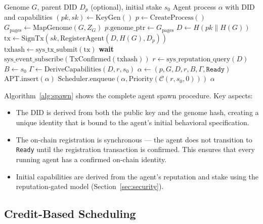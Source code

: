 \documentclass{article}
\begin{document}
\begin{algorithm}[t]
\caption{Agent Process Spawn}
\label{alg:spawn}
\begin{algorithmic}[1]
\REQUIRE Genome $G$, parent DID $D_p$ (optional), initial stake $s_0$
\ENSURE Agent process $\alpha$ with DID and capabilities
\STATE $(pk, sk) \leftarrow \text{KeyGen}()$ 
\STATE $p \leftarrow \text{CreateProcess}()$ 
\STATE $G_{\text{pages}} \leftarrow \text{MapGenome}(G, Z_G)$ 
\STATE $p.\text{genome\_ptr} \leftarrow G_{\text{pages}}$
\STATE $D \leftarrow H(pk \| H(G))$ 
\STATE $\text{tx} \leftarrow \text{SignTx}(sk, \text{RegisterAgent}(D, H(G), D_p))$
\STATE $\text{txhash} \leftarrow \text{sys\_tx\_submit}(\text{tx})$ 
\STATE \textbf{wait} $\text{sys\_event\_subscribe}(\text{TxConfirmed}(\text{txhash}))$
\STATE $r \leftarrow \text{sys\_reputation\_query}(D)$ 
\STATE $B \leftarrow s_0$ 
\STATE $\Gamma \leftarrow \text{DeriveCapabilities}(D, r, s_0)$ 
\STATE $\alpha \leftarrow (p, G, D, r, B, \Gamma, \texttt{Ready})$
\STATE $\text{APT}.\text{insert}(\alpha)$ 
\STATE $\text{Scheduler}.\text{enqueue}(\alpha, \text{Priority}(\mathcal{C}(r, s_0, 0)))$
\RETURN $\alpha$
\end{algorithmic}
\end{algorithm}

Algorithm~\ref{alg:spawn} shows the complete agent spawn procedure. Key aspects:

\begin{itemize}[leftmargin=*]
    \item The DID is derived from both the public key and the genome hash, creating a unique identity that is bound to the agent's initial behavioral specification.
    \item The on-chain registration is synchronous — the agent does not transition to \texttt{Ready} until the registration transaction is confirmed. This ensures that every running agent has a confirmed on-chain identity.
    \item Initial capabilities are derived from the agent's reputation and stake using the reputation-gated model (Section~\ref{sec:security}).
\end{itemize}

\subsection{Credit-Based Scheduling}
\end{document}
